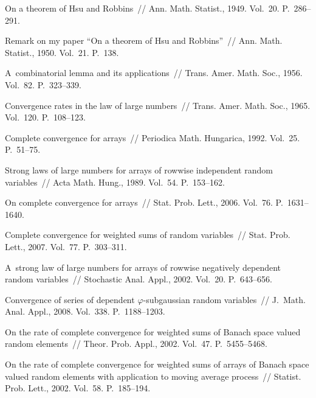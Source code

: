 \begin{multicols}{2}
{{\begin{thebibliography}{99}
On a theorem of Hsu and Robbins~// Ann. Math. Statist., 1949. Vol.~20. P.~286--291.

Remark on my paper ``On a theorem of Hsu and Robbins''~// Ann. Math. Statist., 1950.
Vol.~21. P.~138.

 A~combinatorial lemma and its applications~//  Trans. Amer. Math. Soc., 1956. Vol.~82.
P.~323--339.


Convergence rates in the law of large numbers~// Trans. Amer. Math. Soc., 1965.
Vol.~120. P.~108--123.

 Complete convergence for arrays~// 
Periodica Math. Hungarica, 1992. Vol.~25. P.~51--75.


 Strong laws of large numbers for arrays of rowwise independent
random variables~//  Acta Math. Hung.,  1989. Vol.~54. P.~153--162.

 On complete convergence for arrays~//  Stat. Prob. Lett.,  2006.
Vol.~76. P.~1631--1640.

  Complete convergence for weighted sums of random variables~//
Stat. Prob. Lett., 2007. Vol.~77. P.~303--311.

A~strong law of large numbers for arrays of rowwise
negatively dependent random variables~// Stochastic Anal. Appl., 2002. Vol.~20. P.~643--656.

  Convergence of series of dependent
$\varphi$-subgaussian random variables~// J.~Math. Anal. Appl., 2008.
Vol.~338. P.~1188--1203.

  On the rate of complete convergence for weighted sums of
Banach space valued random elements~//  Theor. Prob. Appl., 2002. Vol.~47. P.~5455--5468.

On the rate of complete convergence for weighted sums of
arrays of Banach space valued random elements with application to moving average process~// 
Statist. Prob. Lett.,  2002. Vol.~58. P.~185--194.



\end{thebibliography}
}
}


\end{multicols}

